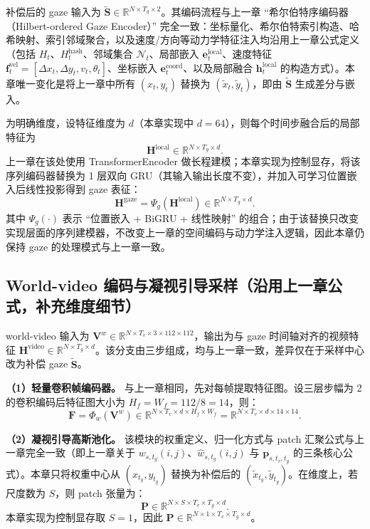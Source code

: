 \documentclass{xdupgthesis}
\begin{document}
补偿后的 gaze 输入为 $\tilde{\mathbf{S}}\in\mathbb{R}^{N\times T_g\times 2}$。其编码流程与上一章 ``希尔伯特序编码器（Hilbert-ordered Gaze Encoder）'' 完全一致：坐标量化、希尔伯特索引构造、哈希映射、索引邻域聚合，以及速度/方向等动力学特征注入均沿用上一章公式定义（包括 $H_t$、$H^{\text{hash}}_t$、邻域集合 $\mathcal{N}_t$、局部嵌入 $\mathbf{e}^{\text{local}}_t$、速度特征 $\mathbf{f}^{\text{vel}}_t=[\Delta x_t,\Delta y_t,v_t,\theta_t]$、坐标嵌入 $\mathbf{e}^{\text{coord}}_t$、以及局部融合 $\mathbf{h}^{\text{local}}_t$ 的构造方式）。本章唯一变化是将上一章中所有 $(x_t,y_t)$ 替换为 $(\tilde{x}_t,\tilde{y}_t)$，即由 $\tilde{\mathbf{S}}$ 生成差分与嵌入。

为明确维度，设特征维度为 $d$（本章实现中 $d=64$），则每个时间步融合后的局部特征为
\begin{equation}
\mathbf{H}^{\text{local}}\in\mathbb{R}^{N\times T_g\times d}.
\end{equation}
上一章在该处使用 TransformerEncoder 做长程建模；本章实现为控制显存，将该序列编码器替换为 1 层双向 GRU（其输入输出长度不变），并加入可学习位置嵌入后线性投影得到 gaze 表征：
\begin{equation}
\mathbf{H}^{\text{gaze}}=\Psi_g(\mathbf{H}^{\text{local}})\in\mathbb{R}^{N\times T_g\times d}.
\end{equation}
其中 $\Psi_g(\cdot)$ 表示 ``位置嵌入 + BiGRU + 线性映射'' 的组合；由于该替换只改变实现层面的序列建模器，不改变上一章的空间编码与动力学注入逻辑，因此本章仍保持 gaze 的处理模式与上一章一致。

\subsection{World-video 编码与凝视引导采样（沿用上一章公式，补充维度细节）}

world-video 输入为 $\mathbf{V}^w\in\mathbb{R}^{N\times T_v\times 3\times 112\times 112}$，输出为与 gaze 时间轴对齐的视频特征 $\mathbf{H}^{\text{video}}\in\mathbb{R}^{N\times T_g\times d}$。该分支由三步组成，均与上一章一致，差异仅在于采样中心改为补偿 gaze $\tilde{\mathbf{S}}$。

\textbf{（1）轻量卷积帧编码器。} 与上一章相同，先对每帧提取特征图。设三层步幅为 2 的卷积编码后特征图大小为 $H_f=W_f=112/8=14$，则：
\begin{equation}
\mathbf{F}=\Phi_w(\mathbf{V}^w)\in\mathbb{R}^{N\times T_v\times d\times H_f\times W_f}
=\mathbb{R}^{N\times T_v\times d\times 14\times 14}.
\end{equation}

\textbf{（2）凝视引导高斯池化。} 该模块的权重定义、归一化方式与 patch 汇聚公式与上一章完全一致（即上一章关于 $w_{s,t_g}(i,j)$、$\hat{w}_{s,t_g}(i,j)$ 与 $\mathbf{p}_{s,t_v,t_g}$ 的三条核心公式）。本章只将权重中心从 $(x_{t_g},y_{t_g})$ 替换为补偿后的 $(\tilde{x}_{t_g},\tilde{y}_{t_g})$。在维度上，若尺度数为 $S$，则 patch 张量为：
\begin{equation}
\mathbf{P}\in\mathbb{R}^{N\times S\times T_v\times T_g\times d}.
\end{equation}
本章实现为控制显存取 $S=1$，因此 $\mathbf{P}\in\mathbb{R}^{N\times 1\times T_v\times T_g\times d}$。
\end{document}
